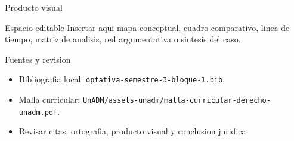 \documentclass[
  spanish,
  aspectratio=169,
  xcolor={dvipsnames,table}
]{beamer}
\begin{document}
\begin{frame}{Producto visual}
  \begin{block}{Espacio editable}
    Insertar aqui mapa conceptual, cuadro comparativo, linea de tiempo,
    matriz de analisis, red argumentativa o sintesis del caso.
  \end{block}
  \centering
\end{frame}

\begin{frame}{Fuentes y revision}
  \begin{itemize}
    \item Bibliografia local: \texttt{optativa-semestre-3-bloque-1.bib}.
    \item Malla curricular: \texttt{UnADM/assets-unadm/malla-curricular-derecho-unadm.pdf}.
    \item Revisar citas, ortografia, producto visual y conclusion juridica.
  \end{itemize}
\end{frame}
\end{document}
